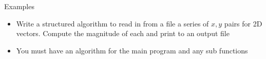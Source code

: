 \documentclass[11pt,professionalfonts]{beamer}
\begin{document}
\begin{frame}{Examples}
    \begin{itemize}
        \item Write a structured algorithm to read in from a file a series of \(x, y\) pairs for 2D vectors.
            Compute the magnitude of each and print to an output file
        \item You must have an algorithm for the main program and any sub functions
    \end{itemize}
\end{frame}
\end{document}
